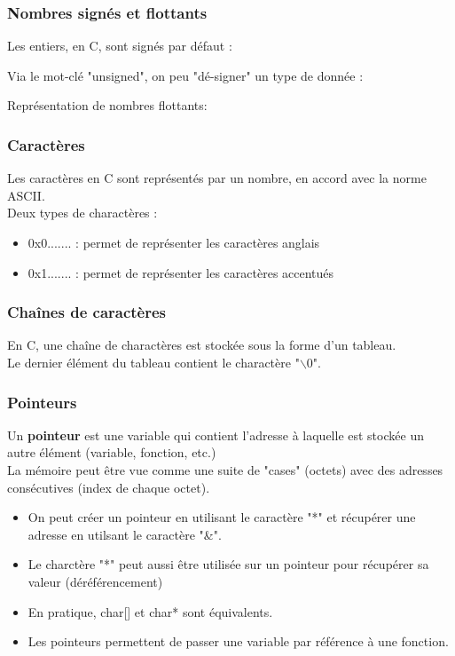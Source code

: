 \documentclass{article}
\newcommand{\insertslide}[2]{
\begin{center}
    \fbox{\texttt{[image: \#1]}}
\end{center}
}
\begin{document}
        \subsubsection{Nombres signés et flottants}
            Les entiers, en C, sont signés par défaut :
            \insertslide{Slides/CM2.pdf}{22}
            Via le mot-clé "unsigned", on peu "dé-signer" un type de donnée :
            \insertslide{Slides/CM2.pdf}{21}
            Représentation de nombres flottants:
            \insertslide{Slides/CM2.pdf}{23}
        
        \subsubsection{Caractères}
            Les caractères en C sont représentés par un nombre, en accord avec la
            norme ASCII.\\
            Deux types de charactères :
            \begin{itemize}
                \item 0x0....... : permet de représenter les caractères anglais
                \item 0x1....... : permet de représenter les caractères accentués
            \end{itemize}
            \insertslide{Slides/CM2.pdf}{26}
        
        \subsubsection{Chaînes de caractères}
            En C, une chaîne de charactères est stockée sous la forme d'un tableau.\\
            Le dernier élément du tableau contient le charactère "$\backslash$0".
\pagebreak
        \subsubsection{Pointeurs}
            Un \textbf{pointeur} est une variable qui contient l’adresse à
            laquelle est stockée un autre élément (variable, fonction, etc.)\\
            La mémoire peut être vue comme une suite de "cases" (octets) avec des 
            adresses consécutives (index de chaque octet).
            \begin{itemize}
                \item On peut créer un pointeur en utilisant le caractère "*" et récupérer
                une adresse en utilsant le caractère "\&".
                \item Le charctère "*" peut aussi être utilisée sur un pointeur pour récupérer sa valeur (déréférencement)
                \item En pratique, char[] et char* sont équivalents.
                \item Les pointeurs permettent de passer une variable par référence à une fonction.
            \end{itemize}
        
\end{document}
